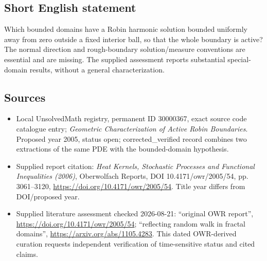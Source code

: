 \documentclass[11pt]{article}
\begin{document}
\subsection{Short English statement}
Which bounded domains have a Robin harmonic solution bounded uniformly away from zero outside a fixed interior ball, so that the whole boundary is active? The normal direction and rough-boundary solution/measure conventions are essential and are missing. The supplied assessment reports substantial special-domain results, without a general characterization.
\subsection{Sources}
\begin{itemize}
\item Local UnsolvedMath registry, permanent ID 30000367, exact source code catalogue entry; \emph{Geometric Characterization of Active Robin Boundaries}. Proposed year 2005, status open; corrected\_verified record combines two extractions of the same PDE with the bounded-domain hypothesis.
\item Supplied report citation: \emph{Heat Kernels, Stochastic Processes and Functional Inequalities (2006)}, Oberwolfach Reports, DOI 10.4171/owr/2005/54, pp. 3061--3120, \url{https://doi.org/10.4171/owr/2005/54}. Title year differs from DOI/proposed year.
\item Supplied literature assessment checked 2026-08-21: ``original OWR report'', \url{https://doi.org/10.4171/owr/2005/54}; ``reflecting random walk in fractal domains'', \url{https://arxiv.org/abs/1105.4283}. This dated OWR-derived curation requests independent verification of time-sensitive status and cited claims.
\end{itemize}
\end{document}
